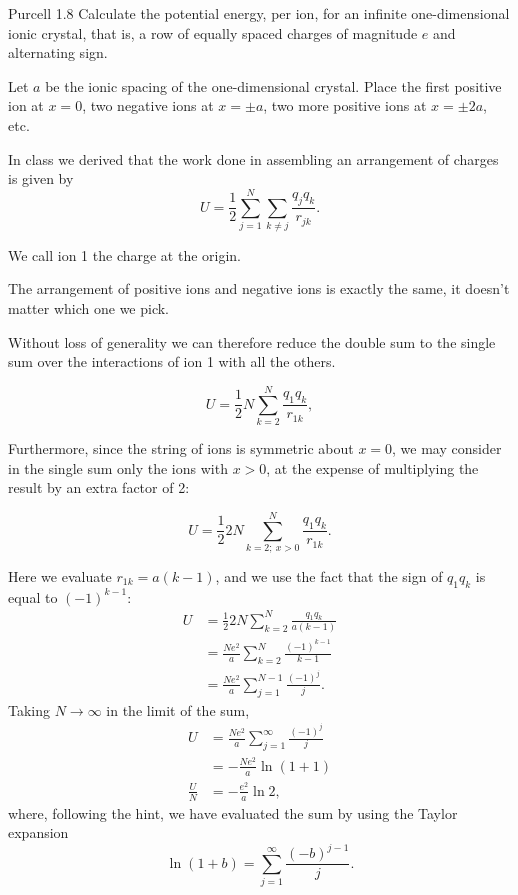 \documentclass{esg8022pset}
\begin{document}
\begin{problem}{Purcell 1.8}
  Calculate the potential energy, per ion, for an infinite one-dimensional ionic crystal, that is, a row of equally spaced charges of magnitude $e$ and alternating sign.
  
  \noindent [\emph{Hint}: The power series expansion of $\ln(1+x)$,
  $$\ln(1+x) = \sum_{j=1}^\infty \frac{(-x)^{j-1}}{j},$$
  may be of use.]
\end{problem}
\begin{solution}
  Let $a$ be the ionic spacing of the one-dimensional crystal. Place the first positive ion at $x = 0$, two negative ions at $x = \pm a$, two more positive ions at $x = \pm 2a$, etc.
  
  In class we derived that the work done in assembling an arrangement of charges is given by
  $$U = \frac12 \sum_{j=1}^N\sum_{k\ne j} \frac{q_j q_k}{r_{jk}}.$$
  
  We call ion 1 the charge at the origin.
  
  The arrangement of positive ions and negative ions is exactly the same, it doesn't matter which one we pick.
  
  Without loss of generality we can therefore reduce the double sum to the single sum over the interactions of ion 1 with all the others.
  
  $$U = \frac12 N\sum_{k=2}^N \frac{q_1 q_k}{r_{1k}},$$
  
  Furthermore, since the string of ions is symmetric about $x = 0$, we may consider in the single sum only the ions with $x > 0$, at the expense of multiplying the result by an extra factor of 2:
  
  $$U = \frac12 2N \sum_{k = 2;\ x > 0}^N \frac{q_1 q_k}{r_{1k}}.$$
  
  Here we evaluate $r_{1k} = a(k-1)$, and we use the fact that the sign of $q_1 q_k$ is equal to $(-1)^{k-1}$:
  \begin{align*}
    U & = \frac12 2N \sum_{k = 2}^N \frac{q_1 q_k}{a(k-1)} \\
      & = \frac{N e^2}{a} \sum_{k=2}^N \frac{(-1)^{k-1}}{k-1} \\
      & = \frac{N e^2}{a} \sum_{j=1}^{N-1} \frac{(-1)^j}{j}.
  \end{align*}
  Taking $N \to\infty$ in the limit of the sum,
  \begin{align*}
    U & = \frac{N e^2}{a} \sum_{j=1}^\infty \frac{(-1)^j}{j} \\
      & = -\frac{N e^2}{a}\ln(1 + 1) \\
    \frac{U}{N} & = -\frac{e^2}{a}\ln 2,
  \end{align*}
  where, following the hint, we have evaluated the sum by using the Taylor expansion
  $$\ln(1 + b) = \sum_{j=1}^\infty \frac{(-b)^{j-1}}{j}.$$
\end{solution}
\end{document}
